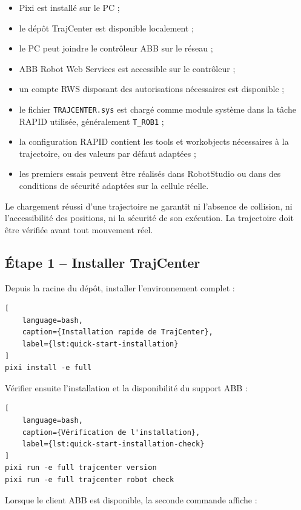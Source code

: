 \documentclass{rapportENSAM}
\begin{document}
\begin{itemize}
    \item Pixi est installé sur le PC ;
    \item le dépôt TrajCenter est disponible localement ;
    \item le PC peut joindre le contrôleur ABB sur le réseau ;
    \item ABB Robot Web Services est accessible sur le contrôleur ;
    \item un compte RWS disposant des autorisations nécessaires est disponible ;
    \item le fichier \texttt{TRAJCENTER.sys} est chargé comme module système
    dans la tâche RAPID utilisée, généralement \texttt{T\_ROB1} ;
    \item la configuration RAPID contient les tools et workobjects nécessaires
    à la trajectoire, ou des valeurs par défaut adaptées ;
    \item les premiers essais peuvent être réalisés dans RobotStudio ou dans
    des conditions de sécurité adaptées sur la cellule réelle.
\end{itemize}

Le chargement réussi d'une trajectoire ne garantit ni l'absence de collision, ni l'accessibilité des positions, ni la sécurité de son exécution. La trajectoire doit être vérifiée avant tout mouvement réel.

\subsection{Étape 1 -- Installer TrajCenter}
\label{subsec:quick-start-installation}

Depuis la racine du dépôt, installer l'environnement complet :

\begin{lstlisting}[
    language=bash,
    caption={Installation rapide de TrajCenter},
    label={lst:quick-start-installation}
]
pixi install -e full
\end{lstlisting}

Vérifier ensuite l'installation et la disponibilité du support ABB :

\begin{lstlisting}[
    language=bash,
    caption={Vérification de l'installation},
    label={lst:quick-start-installation-check}
]
pixi run -e full trajcenter version
pixi run -e full trajcenter robot check
\end{lstlisting}

Lorsque le client ABB est disponible, la seconde commande affiche :
\end{document}
